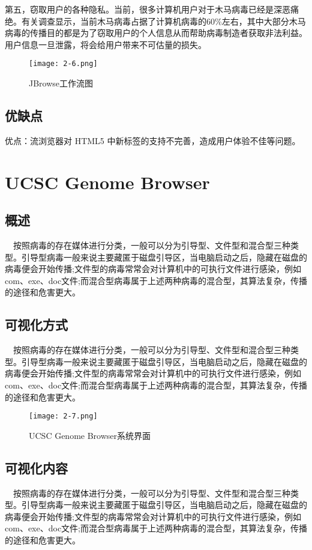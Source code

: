 		第五，窃取用户的各种隐私。当前，很多计算机用户对于木马病毒已经是深恶痛绝。有关调查显示，当前木马病毒占据了计算机病毒的60\%左右，其中大部分木马病毒的传播目的都是为了窃取用户的个人信息从而帮助病毒制造者获取非法利益。用户信息一旦泄露，将会给用户带来不可估量的损失。
		\begin{figure}[!ht]
			\centering
			\texttt{[image: 2-6.png]}
			\caption{JBrowse工作流图}
		\end{figure}
		\subsection{优缺点}
		优点：流浏览器对 HTML5 中新标签的支持不完善，造成用户体验不佳等问题。
	\section{UCSC Genome Browser}		
			\subsection{概述}	
			　按照病毒的存在媒体进行分类，一般可以分为引导型、文件型和混合型三种类型。引导型病毒一般来说主要藏匿于磁盘引导区，当电脑启动之后，隐藏在磁盘的病毒便会开始传播;文件型的病毒常常会对计算机中的可执行文件进行感染，例如com、exe、doc文件;而混合型病毒属于上述两种病毒的混合型，其算法复杂，传播的途径和危害更大。
			\subsection{可视化方式}		
			　按照病毒的存在媒体进行分类，一般可以分为引导型、文件型和混合型三种类型。引导型病毒一般来说主要藏匿于磁盘引导区，当电脑启动之后，隐藏在磁盘的病毒便会开始传播;文件型的病毒常常会对计算机中的可执行文件进行感染，例如com、exe、doc文件;而混合型病毒属于上述两种病毒的混合型，其算法复杂，传播的途径和危害更大。
			\begin{figure}[!ht]
				\centering
				\texttt{[image: 2-7.png]}
				\caption{UCSC Genome Browser系统界面}
			\end{figure}
			\subsection{可视化内容}		
			　按照病毒的存在媒体进行分类，一般可以分为引导型、文件型和混合型三种类型。引导型病毒一般来说主要藏匿于磁盘引导区，当电脑启动之后，隐藏在磁盘的病毒便会开始传播;文件型的病毒常常会对计算机中的可执行文件进行感染，例如com、exe、doc文件;而混合型病毒属于上述两种病毒的混合型，其算法复杂，传播的途径和危害更大。
